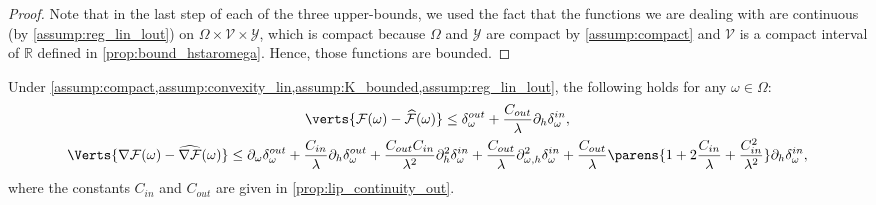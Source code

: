 \begin{proof}
Note that in the last step of each of the three upper-bounds, we used the fact that the functions we are dealing with are continuous (by \cref{assump:reg_lin_lout}) on $\Omega\times\mathcal{V}\times\mathcal{Y}$, which is compact because $\Omega$ and $\mathcal{Y}$ are compact by \cref{assump:compact} and $\mathcal{V}$ is a compact interval of $\mathbb{R}$ defined in \cref{prop:bound_hstaromega}. Hence, those functions are bounded.
\end{proof}


\begin{proposition}\label{prop:grad_app_bound}
    Under \cref{assump:compact,assump:convexity_lin,assump:K_bounded,assump:reg_lin_lout}, the following holds for any $\omega\in\Omega$:
    \begin{gather*}
    \verts{\mathcal{F}(\omega)-\widehat{\mathcal{F}}(\omega)}\leq 
    \Dout
    +\frac{C_{out}}{\lambda}\Dinh,\\
 	\Verts{\nabla\mathcal{F}(\omega)-\widehat{\nabla\mathcal{F}}(\omega)}
 	\leq  
 	\Doutw  + \frac{C_{in}}{\lambda}\Douth + \frac{C_{out}C_{in}}{\lambda^2}\Dinhh + \frac{C_{out}}{\lambda}\Dinwh + \frac{C_{out}}{\lambda}\parens{1 + 2\frac{C_{in}}{\lambda}  + \frac{C_{in}^2}{\lambda^2} }\Dinh,
    \end{gather*}
 where the constants $C_{in}$ and $C_{out}$ are given in {\cref{prop:lip_continuity_out}}.
\end{proposition}
